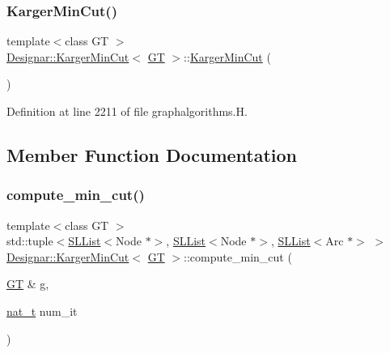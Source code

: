 \subsubsection{\texorpdfstring{Karger\+Min\+Cut()}{KargerMinCut()}\hspace{0.1cm}{\footnotesize\ttfamily [2/2]}}
{\footnotesize\ttfamily template$<$class GT $>$ \\
\hyperlink{class_designar_1_1_karger_min_cut}{Designar\+::\+Karger\+Min\+Cut}$<$ \hyperlink{demo-buildgraph_8_c_a3001c40d2c31ca87ed96cd7d1334a55e}{GT} $>$\+::\hyperlink{class_designar_1_1_karger_min_cut}{Karger\+Min\+Cut} (\begin{DoxyParamCaption}{ }\end{DoxyParamCaption})\hspace{0.3cm}{\ttfamily [inline]}}



Definition at line 2211 of file graphalgorithms.\+H.



\subsection{Member Function Documentation}
\mbox{\label{class_designar_1_1_karger_min_cut_a62479a7ca1e7202a93cded87a9d09b8b}} 
\subsubsection{\texorpdfstring{compute\+\_\+min\+\_\+cut()}{compute\_min\_cut()}\hspace{0.1cm}{\footnotesize\ttfamily [1/2]}}
{\footnotesize\ttfamily template$<$class GT $>$ \\
std\+::tuple$<$\hyperlink{class_designar_1_1_s_l_list}{S\+L\+List}$<$Node $\ast$$>$, \hyperlink{class_designar_1_1_s_l_list}{S\+L\+List}$<$Node $\ast$$>$, \hyperlink{class_designar_1_1_s_l_list}{S\+L\+List}$<$Arc $\ast$$>$ $>$ \hyperlink{class_designar_1_1_karger_min_cut}{Designar\+::\+Karger\+Min\+Cut}$<$ \hyperlink{demo-buildgraph_8_c_a3001c40d2c31ca87ed96cd7d1334a55e}{GT} $>$\+::compute\+\_\+min\+\_\+cut (\begin{DoxyParamCaption}\item[{\hyperlink{demo-buildgraph_8_c_a3001c40d2c31ca87ed96cd7d1334a55e}{GT} \&}]{g,  }\item[{\hyperlink{namespace_designar_aa72662848b9f4815e7bf31a7cf3e33d1}{nat\+\_\+t}}]{num\+\_\+it }\end{DoxyParamCaption})\hspace{0.3cm}{\ttfamily [inline]}}



